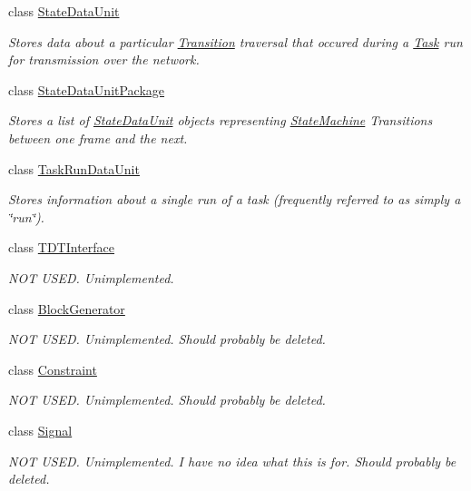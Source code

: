 \begin{DoxyCompactItemize}
class \hyperlink{class_picto_1_1_state_data_unit}{State\-Data\-Unit}
\begin{DoxyCompactList}\small\item\em Stores data about a particular \hyperlink{class_picto_1_1_transition}{Transition} traversal that occured during a \hyperlink{class_picto_1_1_task}{Task} run for transmission over the network. \end{DoxyCompactList}\item 
class \hyperlink{class_picto_1_1_state_data_unit_package}{State\-Data\-Unit\-Package}
\begin{DoxyCompactList}\small\item\em Stores a list of \hyperlink{class_picto_1_1_state_data_unit}{State\-Data\-Unit} objects representing \hyperlink{class_picto_1_1_state_machine}{State\-Machine} Transitions between one frame and the next. \end{DoxyCompactList}\item 
class \hyperlink{class_picto_1_1_task_run_data_unit}{Task\-Run\-Data\-Unit}
\begin{DoxyCompactList}\small\item\em Stores information about a single run of a task (frequently referred to as simply a \char`\"{}run\char`\"{}). \end{DoxyCompactList}\item 
class \hyperlink{class_picto_1_1_t_d_t_interface}{T\-D\-T\-Interface}
\begin{DoxyCompactList}\small\item\em N\-O\-T U\-S\-E\-D. Unimplemented. \end{DoxyCompactList}\item 
class \hyperlink{class_picto_1_1_block_generator}{Block\-Generator}
\begin{DoxyCompactList}\small\item\em N\-O\-T U\-S\-E\-D. Unimplemented. Should probably be deleted. \end{DoxyCompactList}\item 
class \hyperlink{class_picto_1_1_constraint}{Constraint}
\begin{DoxyCompactList}\small\item\em N\-O\-T U\-S\-E\-D. Unimplemented. Should probably be deleted. \end{DoxyCompactList}\item 
class \hyperlink{class_picto_1_1_signal}{Signal}
\begin{DoxyCompactList}\small\item\em N\-O\-T U\-S\-E\-D. Unimplemented. I have no idea what this is for. Should probably be deleted. \end{DoxyCompactList}\item 

\end{DoxyCompactItemize}
